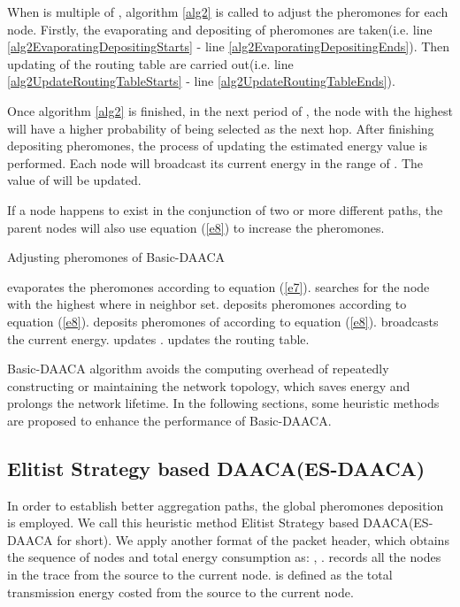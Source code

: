\documentclass{elsarticle}
\begin{document}
When  is multiple of , algorithm \ref{alg2} is called to adjust the pheromones for each node. Firstly, the evaporating and depositing of pheromones are taken(i.e. line \ref{alg2EvaporatingDepositingStarts} - line \ref{alg2EvaporatingDepositingEnds}). Then updating of the routing table are carried out(i.e. line \ref{alg2UpdateRoutingTableStarts} - line \ref{alg2UpdateRoutingTableEnds}).

Once algorithm \ref{alg2} is finished, in the next period of , the node with the highest  will have a higher probability of being selected as the next hop. After finishing depositing pheromones, the process of updating the estimated energy value is performed. Each node will broadcast its current energy in the range of . The value of  will be updated.

If a node happens to exist in the conjunction of two or more different paths, the parent nodes will also use equation (\ref{e8}) to increase the pheromones.

\begin{algorithm}
\caption{Adjusting pheromones of Basic-DAACA} \label{alg2}
\begin{algorithmic}[1]
\FORALL {} \label{alg2EvaporatingDepositingStarts}
\STATE  evaporates the pheromones according to equation (\ref{e7}).
\STATE  searches for the node with the highest  where   in neighbor set.
\STATE  deposits pheromones according to equation (\ref{e8}).
\IF {}
\FORALL{}
\STATE  deposits pheromones of  according to equation (\ref{e8}).
\STATE  broadcasts the current energy.
\ENDFOR \label{alg2EvaporatingDepositingEnds}
\ENDIF
{} \label{alg2UpdateRoutingTableStarts}
\STATE  updates .
\STATE  updates the routing table.
\ENDIF \label{alg2UpdateRoutingTableEnds}
\ENDFOR
\end{algorithmic}
\end{algorithm}
Basic-DAACA algorithm avoids the computing overhead of repeatedly constructing or maintaining the network topology, which saves energy and prolongs the network lifetime. In the following sections, some heuristic methods are proposed to enhance the performance of Basic-DAACA.

\subsection{Elitist Strategy based DAACA(ES-DAACA)} \label{ESDAACA}
In order to establish better aggregation paths, the global pheromones deposition is employed. We call this heuristic method Elitist Strategy based DAACA(ES-DAACA for short). We apply another format of the packet header, which obtains the  sequence of nodes and total energy consumption as: {, }.  records all the nodes in the trace from the source to the current node.  is defined as the total transmission energy costed from the source to the current node.
\end{document}
